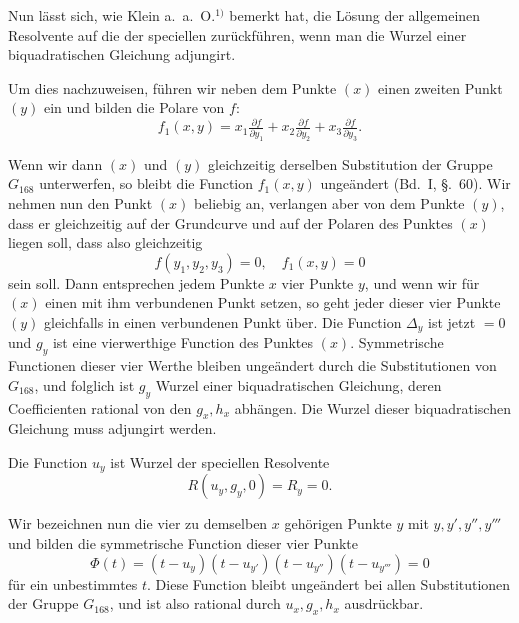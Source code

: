 \documentclass[12pt,a4paper]{article}
\begin{document}
Nun l\"asst sich, wie Klein a.~a.~O.$^{1)}$ bemerkt hat, die L\"osung der allgemeinen Resolvente auf die der speciellen zur\"uckf\"uhren, wenn man die Wurzel einer biquadratischen Gleichung adjungirt.

Um dies nachzuweisen, f\"uhren wir neben dem Punkte $(x)$ einen zweiten Punkt $(y)$ ein und bilden die Polare von $f$:
\begin{equation}
\label{eq:polare} f_1(x, y) = x_1 \tfrac{\partial f}{\partial y_1} + x_2 \tfrac{\partial f}{\partial y_2} + x_3 \tfrac{\partial f}{\partial y_3}.
\end{equation}

Wenn wir dann $(x)$ und $(y)$ gleichzeitig derselben Substitution der Gruppe $G_{168}$ unterwerfen, so bleibt die Function $f_1(x, y)$ unge\"andert (Bd.~I, \S.~60). Wir nehmen nun den Punkt $(x)$ beliebig an, verlangen aber von dem Punkte $(y)$, dass er gleichzeitig auf der Grundcurve und auf der Polaren des Punktes $(x)$ liegen soll, dass also gleichzeitig
\begin{equation}
\label{eq:bed4} f(y_1, y_2, y_3) = 0, \quad f_1(x, y) = 0
\end{equation}
sein soll. Dann entsprechen jedem Punkte $x$ vier Punkte $y$, und wenn wir f\"ur $(x)$ einen mit ihm verbundenen Punkt setzen, so geht jeder dieser vier Punkte $(y)$ gleichfalls in einen verbundenen Punkt \"uber. Die Function $\Delta_y$ ist jetzt $= 0$ und $g_y$ ist eine vierwerthige Function des Punktes $(x)$. Symmetrische Functionen dieser vier Werthe bleiben unge\"andert durch die Substitutionen von $G_{168}$, und folglich ist $g_y$ Wurzel einer biquadratischen Gleichung, deren Coefficienten rational von den $g_x, h_x$ abh\"angen. Die Wurzel dieser biquadratischen Gleichung muss adjungirt werden.

Die Function $u_y$ ist Wurzel der speciellen Resolvente
\begin{equation}
\label{eq:specres} R(u_y, g_y, 0) = R_y = 0.
\end{equation}

Wir bezeichnen nun die vier zu demselben $x$ geh\"origen Punkte $y$ mit $y, y', y'', y'''$ und bilden die symmetrische Function dieser vier Punkte
\begin{equation}
\label{eq:symf} \Phi(t) = (t - u_y)(t - u_{y'})(t - u_{y''})(t - u_{y'''}) = 0
\end{equation}
f\"ur ein unbestimmtes $t$. Diese Function bleibt unge\"andert bei allen Substitutionen der Gruppe $G_{168}$, und ist also rational durch $u_x, g_x, h_x$ ausdr\"uckbar.
\end{document}
